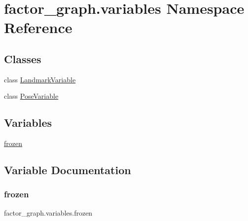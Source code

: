 \hypertarget{namespacefactor__graph_1_1variables}{}\section{factor\+\_\+graph.\+variables Namespace Reference}
\label{namespacefactor__graph_1_1variables}
\subsection*{Classes}
\begin{DoxyCompactItemize}
\item
class \hyperlink{classfactor__graph_1_1variables_1_1LandmarkVariable}{Landmark\+Variable}
\item
class \hyperlink{classfactor__graph_1_1variables_1_1PoseVariable}{Pose\+Variable}
\end{DoxyCompactItemize}
\subsection*{Variables}
\begin{DoxyCompactItemize}
\item
\hyperlink{namespacefactor__graph_1_1variables_a34e2ec8256134d4df2075f7b94f6a6e3}{frozen}
\end{DoxyCompactItemize}


\subsection{Variable Documentation}
\mbox{\label{namespacefactor__graph_1_1variables_a34e2ec8256134d4df2075f7b94f6a6e3}}
\subsubsection{\texorpdfstring{frozen}{frozen}}
{\footnotesize\ttfamily factor\+\_\+graph.\+variables.\+frozen}
